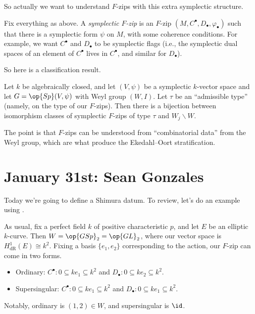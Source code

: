 \documentclass{article}
\begin{document}
So actually we want to understand $F$-zips with this extra symplectic structure.
\begin{definition}
	Fix everything as above. A \textit{symplectic $F$-zip} is an $F$-zip $(M,C^\bullet,D_\bullet,\varphi_\bullet)$ such that there is a symplectic form $\psi$ on $M$, with some coherence conditions. For example, we want $C^\bullet$ and $D_\bullet$ to be symplectic flags (i.e., the symplectic dual spaces of an element of $C^\bullet$ lives in $C^\bullet$, and similar for $D_\bullet$).
\end{definition}
So here is a classification result.
\begin{theorem} \label{thm:classify-symp-f-zip}
	Let $k$ be algebraically closed, and let $(V,\psi)$ be a symplectic $k$-vector space and let $G=\op{Sp}(V,\psi)$ with Weyl group $(W,I)$. Let $\tau$ be an ``admissible type'' (namely, on the type of our $F$-zips). Then there is a bijection between isomorphism classes of symplectic $F$-zips of type $\tau$ and $W_j\backslash W$.
\end{theorem}
The point is that $F$-zips can be understood from ``combinatorial data'' from the Weyl group, which are what produce the Ekedahl--Oort stratification.

\section{January 31st: Sean Gonzales}
Today we're going to define a Shimura datum. To review, let's do an example using .
\begin{example}
		As usual, fix a perfect field $k$ of positive characteristic $p$, and let $E$ be an elliptic $k$-curve. Then $W={\op{GSp}_2}={\op{GL}_2}$, where our vector space is $H^1_{\mathrm{dR}}(E)\cong k^2$. Fixing a basis $\{e_1,e_2\}$ corresponding to the action, our $F$-zip can come in two forms.
		\begin{itemize}
			\item Ordinary: $C^\bullet\colon0\subseteq ke_1\subseteq k^2$ and $D_\bullet\colon 0\subseteq ke_2\subseteq k^2$.
			\item Supersingular: $C^\bullet\colon 0\subseteq ke_1\subseteq k^2$ and $D_\bullet\colon 0\subseteq ke_1\subseteq k^2$.
		\end{itemize}
		Notably, ordinary is $(1,2)\in W$, and supersingular is $\id$.
\end{example}
\end{document}
